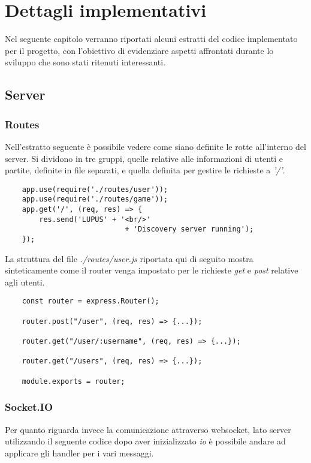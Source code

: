 \section{Dettagli implementativi}
Nel seguente capitolo verranno riportati alcuni estratti del codice implementato per il progetto, con l'obiettivo di evidenziare aspetti affrontati durante lo sviluppo che sono stati ritenuti interessanti.

\subsection{Server}

\subsubsection{Routes}

Nell'estratto seguente è possibile vedere come siano definite le rotte all'interno del server. Si dividono in tre gruppi, quelle relative alle informazioni di utenti e partite, definite in file separati, e quella definita per gestire le richieste a \emph{'/'}.

\begin{verbatim}
    app.use(require('./routes/user'));
    app.use(require('./routes/game'));
    app.get('/', (req, res) => {
        res.send('LUPUS' + '<br/>'
                            + 'Discovery server running');
    });
\end{verbatim}

La struttura del file \emph{./routes/user.js} riportata qui di seguito mostra sinteticamente come il router venga impostato per le richieste \emph{get} e \emph{post} relative agli utenti.

\begin{verbatim}
    const router = express.Router();
    
    router.post("/user", (req, res) => {...});
    
    router.get("/user/:username", (req, res) => {...});
    
    router.get("/users", (req, res) => {...});
    
    module.exports = router;
\end{verbatim}

\subsubsection{Socket.IO}

Per quanto riguarda invece la comunicazione attraverso websocket, lato server utilizzando il seguente codice dopo aver inizializzato \emph{io} è possibile andare ad applicare gli handler per i vari messaggi.

